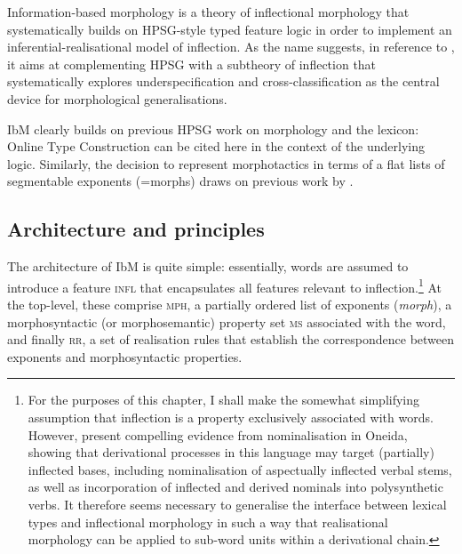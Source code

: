\documentclass[output=paper
 	        ,biblatex
                ,babelshorthands
                ,newtxmath
                ,draftmode
                ,colorlinks, citecolor=brown
]{langscibook}
\begin{document}
\begin{exe}
\begin{xlist}
Information-based morphology \citep{Crysmann:Bonami:2016} is a theory
of inflectional morphology that systematically builds on HPSG-style
typed feature logic in order to implement an inferential-realisational
model of inflection. As the name suggests, in reference to
\citet{Pollard87}, it aims at complementing HPSG with a 
subtheory of inflection that systematically 
explores underspecification and cross-classification as the central
device for morphological generalisations.

IbM clearly builds on previous HPSG work on morphology and the
lexicon: Online Type Construction \citep{Koenig94} can be cited here
in the context of the underlying logic. Similarly, the decision to
represent morphotactics in terms of a flat lists of segmentable
exponents (=morphs) draws on previous work by
\citet{crysmann_b03book}. 


\subsection{Architecture and principles}

The architecture of IbM is quite simple: essentially, words are
assumed to introduce a feature \textsc{infl} that encapsulates all
features relevant to inflection.\footnote{For the purposes of this
  chapter, I shall make the somewhat simplifying assumption that
  inflection is a property exclusively associated with words. However,
  \citet{Koenig:Michelson:2020} present compelling evidence from
  nominalisation in Oneida, showing that derivational processes in
  this language may target (partially) inflected bases, including
  nominalisation of aspectually inflected verbal stems, as well as
  incorporation of inflected and derived nominals into polysynthetic
  verbs. It therefore seems necessary to generalise the interface
  between lexical types and inflectional morphology in such a way that
realisational morphology can be applied to sub-word units within a
derivational chain. } At the top-level, these comprise \textsc{mph},\label{morphology:page-mph-feature} a partially
ordered list of exponents (\textit{morph}), a morphosyntactic (or
morphosemantic) property set \textsc{ms} associated with the word, and
finally \textsc{rr}, a set of realisation rules that establish the
correspondence between exponents and morphosyntactic properties.

\begin{exe}
  \ex
{}


\end{exe}
\end{xlist}
\end{exe}
\end{document}
